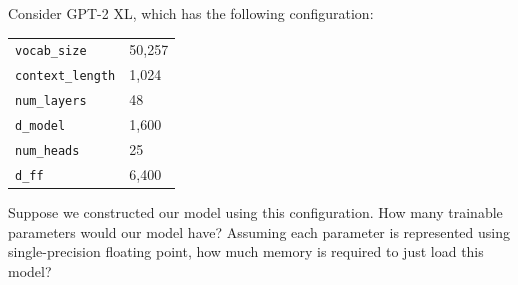 \begin{questionbox}
    Consider GPT-2 XL, which has the following configuration:

    \vspace{0.5em}
    \begin{tabular}{@{}ll}
        \texttt{vocab\_size}     & 50,257 \\
        \texttt{context\_length} & 1,024  \\
        \texttt{num\_layers}     & 48     \\
        \texttt{d\_model}        & 1,600  \\
        \texttt{num\_heads}      & 25     \\
        \texttt{d\_ff}           & 6,400
    \end{tabular}

    \vspace{0.5em}
    Suppose we constructed our model using this configuration. How many trainable parameters would our model have? Assuming each parameter is represented using single-precision floating point, how much memory is required to just load this model?
\end{questionbox}

